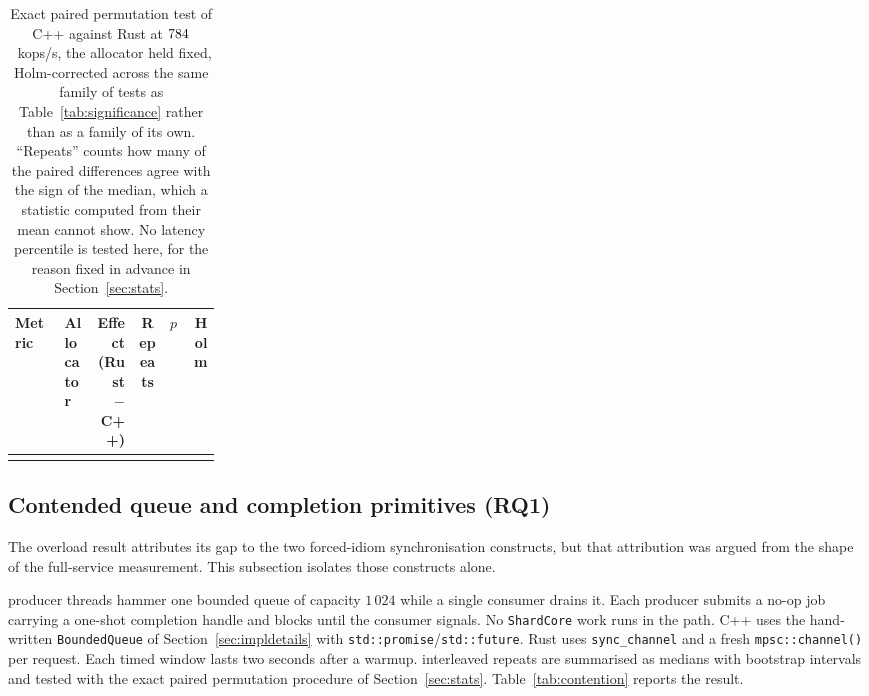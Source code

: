 \documentclass[english,oneside,a4paper,censored,csm,software-track-2020]{HYthesisML}
\begin{document}
\begin{table}[H]
\centering
\small
\caption[Exact paired test past saturation]{Exact paired permutation test of C++ against Rust at
$784$~kops/s, the allocator held fixed, Holm-corrected across the same family of
\NTests{} tests as Table~\ref{tab:significance} rather than as a family of its own. ``Repeats''
counts how many of the \NRepeats{} paired differences agree with the sign of the median, which a
statistic computed from their mean cannot show. No latency percentile is tested here, for the
reason fixed in advance in Section~\ref{sec:stats}.\label{tab:overloadtest}}
\setlength{\tabcolsep}{4pt}
\begin{tabular}{@{}p{0.24\linewidth} l r c r r@{}}
\hline\hline
Metric & Allocator & Effect (Rust $-$ C++) & Repeats & $p$ & Holm \\
\hline
\\
\hline
\end{tabular}
\end{table}

\subsection{Contended queue and completion primitives (RQ1)}\label{sec:contention}
The overload result attributes its gap to the two forced-idiom synchronisation constructs, but
that attribution was argued from the shape of the full-service measurement. This subsection
isolates those constructs alone.

\ContentionProducers{} producer threads hammer one bounded queue of capacity $1\,024$ while a
single consumer drains it. Each producer submits a no-op job carrying a one-shot completion handle and blocks
until the consumer signals. No \texttt{ShardCore} work runs in the path. C++ uses the
hand-written \texttt{BoundedQueue} of Section~\ref{sec:impldetails} with
\texttt{std::promise}/\texttt{std::future}. Rust uses \texttt{sync\_channel} and a fresh
\texttt{mpsc::channel()} per request. Each timed window lasts two seconds after a warmup.
\ContentionRepeats{} interleaved repeats are summarised as medians with bootstrap intervals and
tested with the exact paired permutation procedure of Section~\ref{sec:stats}.
Table~\ref{tab:contention} reports the result.
\end{document}
